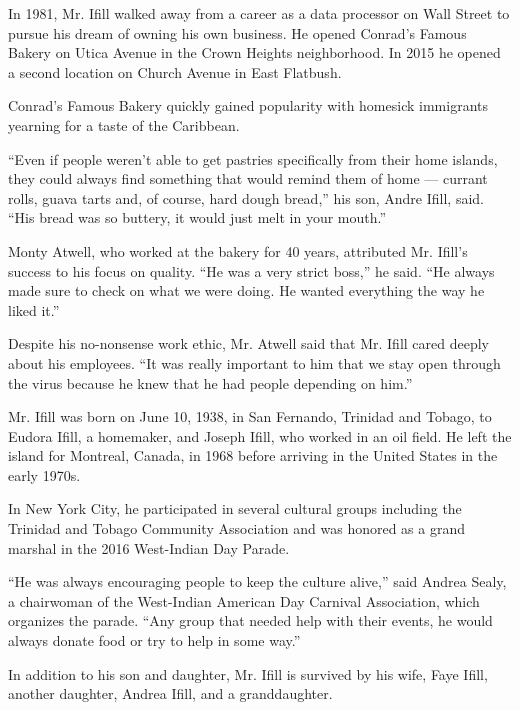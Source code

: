 In 1981, Mr. Ifill walked away from a career as a data processor on Wall
Street to pursue his dream of owning his own business. He opened
Conrad's Famous Bakery on Utica Avenue in the Crown Heights
neighborhood. In 2015 he opened a second location on Church Avenue in
East Flatbush.

Conrad's Famous Bakery quickly gained popularity with homesick
immigrants yearning for a taste of the Caribbean.

``Even if people weren't able to get pastries specifically from their
home islands, they could always find something that would remind them of
home --- currant rolls, guava tarts and, of course, hard dough bread,''
his son, Andre Ifill, said. ``His bread was so buttery, it would just
melt in your mouth.''

Monty Atwell, who worked at the bakery for 40 years, attributed Mr.
Ifill's success to his focus on quality. ``He was a very strict boss,''
he said. ``He always made sure to check on what we were doing. He wanted
everything the way he liked it.''

Despite his no-nonsense work ethic, Mr. Atwell said that Mr. Ifill cared
deeply about his employees. ``It was really important to him that we
stay open through the virus because he knew that he had people depending
on him.''

Mr. Ifill was born on June 10, 1938, in San Fernando, Trinidad and
Tobago, to Eudora Ifill, a homemaker, and Joseph Ifill, who worked in an
oil field. He left the island for Montreal, Canada, in 1968 before
arriving in the United States in the early 1970s.

In New York City, he participated in several cultural groups including
the Trinidad and Tobago Community Association and was honored as a grand
marshal in the 2016 West-Indian Day Parade.

``He was always encouraging people to keep the culture alive,'' said
Andrea Sealy, a chairwoman of the West-Indian American Day Carnival
Association, which organizes the parade. ``Any group that needed help
with their events, he would always donate food or try to help in some
way.''

In addition to his son and daughter, Mr. Ifill is survived by his wife,
Faye Ifill, another daughter, Andrea Ifill, and a granddaughter.

\href{https://www.nytimes.com/interactive/2020/obituaries/people-died-coronavirus-obituaries.html?action=click\&pgtype=Article\&state=default\&region=BELOW_MAIN_CONTENT\&context=covid_obits_promo}{}

